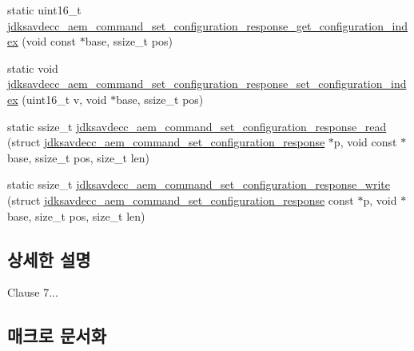 \begin{DoxyCompactItemize}
\item 
static uint16\+\_\+t \hyperlink{group__command__set__configuration__response_ga7fcd774c91658de631938658d07d7003}{jdksavdecc\+\_\+aem\+\_\+command\+\_\+set\+\_\+configuration\+\_\+response\+\_\+get\+\_\+configuration\+\_\+index} (void const $\ast$base, ssize\+\_\+t pos)
\item 
static void \hyperlink{group__command__set__configuration__response_ga229514f45b3e6c01267f632b6558a137}{jdksavdecc\+\_\+aem\+\_\+command\+\_\+set\+\_\+configuration\+\_\+response\+\_\+set\+\_\+configuration\+\_\+index} (uint16\+\_\+t v, void $\ast$base, ssize\+\_\+t pos)
\item 
static ssize\+\_\+t \hyperlink{group__command__set__configuration__response_ga7cf0d85d359a648155990b16b7948583}{jdksavdecc\+\_\+aem\+\_\+command\+\_\+set\+\_\+configuration\+\_\+response\+\_\+read} (struct \hyperlink{structjdksavdecc__aem__command__set__configuration__response}{jdksavdecc\+\_\+aem\+\_\+command\+\_\+set\+\_\+configuration\+\_\+response} $\ast$p, void const $\ast$base, ssize\+\_\+t pos, size\+\_\+t len)
\item 
static ssize\+\_\+t \hyperlink{group__command__set__configuration__response_ga37009742ab4bab11573c25104a94f67a}{jdksavdecc\+\_\+aem\+\_\+command\+\_\+set\+\_\+configuration\+\_\+response\+\_\+write} (struct \hyperlink{structjdksavdecc__aem__command__set__configuration__response}{jdksavdecc\+\_\+aem\+\_\+command\+\_\+set\+\_\+configuration\+\_\+response} const $\ast$p, void $\ast$base, size\+\_\+t pos, size\+\_\+t len)
\end{DoxyCompactItemize}


\subsection{상세한 설명}
Clause 7... 

\subsection{매크로 문서화}
